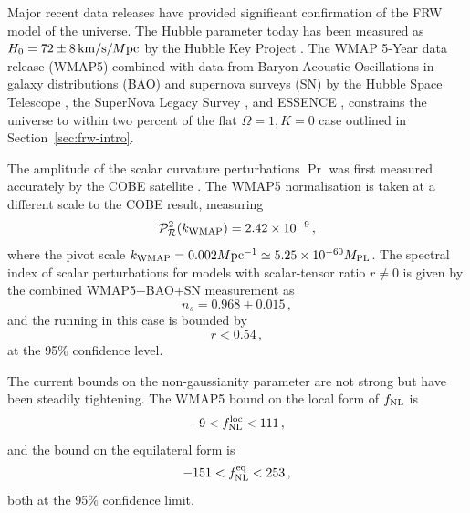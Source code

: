 Major recent data releases have provided significant confirmation of the FRW
model of the universe. The Hubble parameter today has been measured as $H_0 =
72\pm8\,\mathrm{km}/\mathrm{s}/M \mathrm{pc}$ by the Hubble Key Project
\cite{Freedman2001}. The WMAP 5-Year data release (WMAP5) combined with
data from Baryon
Acoustic Oscillations in galaxy distributions (BAO) \cite{Percival2007}
and supernova surveys (SN) by the Hubble Space Telescope \cite{Riess2004,
Riess2007}, the SuperNova Legacy Survey \cite{Astier2006}, and ESSENCE
\cite{Wood-Vasey2007},  constrains the
universe to within two percent of the flat $\Omega =1, K=0$ case outlined in
Section~\ref{sec:frw-intro}. 

The amplitude of the scalar curvature perturbations $\Pr$ was first measured
accurately by the COBE satellite \cite{Bennett1994, Bennett1996c}. The WMAP5
normalisation is taken at a different scale to the COBE result, measuring
% 
\begin{equation}
 \label{eq:wmapnorm-intro}
 \mathcal{P}_{\mathcal{R}}^2 (k_\mathrm{WMAP}) = 2.42 \times 10^{-9}\,,
\end{equation}
% 
where the pivot scale $k_\mathrm{WMAP} = 0.002M \mathrm{pc}^{-1} \simeq 5.25\times 10^{-60}M_{\mathrm{PL}}$. The
spectral index of scalar perturbations for models with scalar-tensor ratio
$r\ne0$ is given by the combined WMAP5+BAO+SN measurement as
% 
\begin{equation}
 \label{eq:wmapns-intro}
 n_s = 0.968 \pm 0.015\,,
\end{equation}
% 
and the running in this case is bounded by
% 
\begin{equation}
\label{eq:rbound-intro}
 r < 0.54\,,
\end{equation}
at the 95\% confidence level.

The current bounds on the non-gaussianity parameter are not strong but have
been steadily tightening. The WMAP5 bound on the local form of $f_{\mathrm{NL}}$ is
% 
\begin{equation}
 -9<f_{\mathrm{NL}}^\mathrm{loc}<111\,,
\end{equation}
% 
and the bound on the equilateral form is
% 
\begin{equation}
 -151<f_{\mathrm{NL}}^{\mathrm{eq}}<253\,,
\end{equation}
% 
both at the 95\% confidence limit. 



